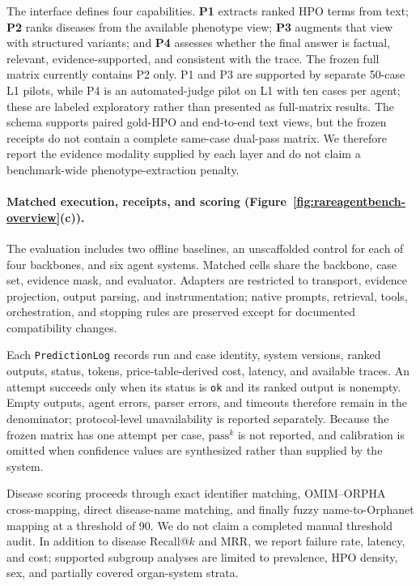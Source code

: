 \documentclass[letterpaper]{article} %
\begin{document}
The interface defines four capabilities. \textbf{P1} extracts ranked HPO
terms from text; \textbf{P2} ranks diseases from the available phenotype
view; \textbf{P3} augments that view with structured variants; and
\textbf{P4} assesses whether the final answer is factual, relevant,
evidence-supported, and consistent with the trace. The frozen full matrix
currently contains P2 only. P1 and P3 are supported by separate 50-case L1
pilots, while P4 is an automated-judge pilot on L1 with ten cases per agent;
these are labeled exploratory rather than presented as full-matrix results.
The schema supports paired gold-HPO and end-to-end text views, but the frozen
receipts do not contain a complete same-case dual-pass matrix. We therefore
report the evidence modality supplied by each layer and do not claim a
benchmark-wide phenotype-extraction penalty.

\paragraph{Matched execution, receipts, and scoring
(Figure~\ref{fig:rareagentbench-overview}(c)).}
The evaluation includes two offline baselines, an unscaffolded control for
each of four backbones, and six agent systems. Matched cells share the
backbone, case set, evidence mask, and evaluator. Adapters are restricted to
transport, evidence projection, output parsing, and instrumentation; native
prompts, retrieval, tools, orchestration, and stopping rules are preserved
except for documented compatibility changes.

Each \texttt{PredictionLog} records run and case identity, system versions,
ranked outputs, status, tokens, price-table-derived cost, latency, and
available traces. An attempt succeeds only when its status is \texttt{ok} and
its ranked output is nonempty. Empty outputs, agent errors, parser errors, and
timeouts therefore remain in the denominator; protocol-level unavailability
is reported separately. Because the frozen matrix has one attempt per case,
$\mathrm{pass}^k$ is not reported, and calibration is omitted when confidence
values are synthesized rather than supplied by the system.

Disease scoring proceeds through exact identifier matching, OMIM--ORPHA
cross-mapping, direct disease-name matching, and finally fuzzy
name-to-Orphanet mapping at a threshold of 90. We do not claim a completed
manual threshold audit. In addition to disease Recall@$k$ and MRR, we report
failure rate, latency, and cost; supported subgroup analyses are limited to
prevalence, HPO density, sex, and partially covered organ-system strata.
\end{document}
